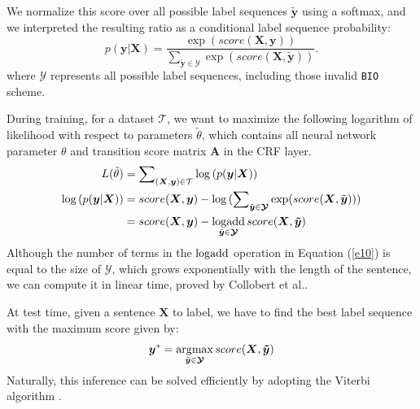 We normalize this score over all possible label sequences $\tilde{\bm{y}}$ using a softmax, and we interpreted the resulting ratio as a conditional label sequence probability:
\begin{equation}
	p(\bm{y}|\bm{X})=\frac{\exp({score(\bm{X}, \bm{y})})}{\sum\nolimits_{\tilde{\bm{y}} \in \bm{\mathcal{Y}}} \exp({score(\bm{X}, \tilde{\bm{y}})})}.
\end{equation}
where $\bm{\mathcal{Y}}$ represents all possible label sequences, including those invalid \texttt{BIO} scheme.

During training, for a dataset $\mathcal{T}$, we want to maximize the following logarithm of likelihood with respect to parameters $\tilde{\theta}$, which contains all neural network parameter $\theta$ and transition score matrix $\bm{A}$ in the CRF layer.
\begin{align}
L(\tilde{\theta}) &= \sum\nolimits_{(\bm{X}, \bm{y}) \in \mathcal{T}}{\log{(p(\bm{y}|\bm{X}))}} \\
\log{(p(\bm{y}|\bm{X}))} &= score(\bm{X}, \bm{y}) - \log{(\sum\nolimits_{\tilde{\bm{y}} \in \bm{\mathcal{Y}}} \exp({score(\bm{X}, \tilde{\bm{y}})}))} \notag	 \\
\label{e10}
&= score(\bm{X}, \bm{y}) - \logadd\limits_{\tilde{\bm{y}} \in \bm{\mathcal{Y}}}score(\bm{X}, \bm{\tilde{y}})
\end{align}
Although the number of terms in the $\operatorname*{\log\!\mathrm{add}}$ operation in Equation (\ref{e10}) is equal to the size of $\bm{\mathcal{Y}}$, which grows exponentially with the length of the sentence, we can compute it in linear time, proved by Collobert et al..

At test time, given a sentence $\bm{X}$ to label, we have to find the best label sequence with the maximum score given by:
\begin{equation}
	\bm{y}^* = \argmax\limits_{\tilde{\bm{y}} \in \bm{\mathcal{Y}}}score(\bm{X}, \bm{\tilde{y}})
\end{equation}
Naturally, this inference can be solved efficiently by adopting the Viterbi algorithm \cite{rabiner1989tutorial}.